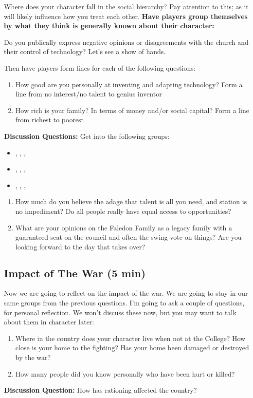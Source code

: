 \documentclass[green]{GL2020}
\begin{document}
Where does your character fall in the social hierarchy? Pay attention to this; as it will likely influence how you treat each other. \textbf{Have players group themselves by what they think is generally known about their character:}

Do you publically express negative opinions or disagreements with the church and their control of technology? Let's see a show of hands. 

Then have players form lines for each of the following questions:
\begin{enumerate}
	\item How good are you personally at inventing and adapting technology? Form a line from no interest/no talent to genius inventor
	\item How rich is your family? In terms of money and/or social capital? Form a line from richest to poorest
\end{enumerate}

\textbf{Discussion Questions:}
Get into the following groups:
\begin{itemize}
	\item \cHeir{}, \cAmbition{}, \cLibrarian{},  \cAssistantScientist{}
	\item \cChupInventor{}, \cHeadScientist{}, \cTechStar{}, \cEthics{}
	\item \cBeetle{}, \cAntiChup{}, \cScholarship{}, \cDiplomat{}
\end{itemize}

\begin{enumerate}
	\item How much do you believe the adage that talent is all you need, and station is no impediment? Do all people really have equal access to opportunities?
	\item What are your opinions on the Faledon Family as a legacy family with a guaranteed seat on the council and often the swing vote on things? Are you looking forward to the day that \cHeir{} takes over?
\end{enumerate}


\subsection*{Impact of The War (5 min)}
Now we are going to reflect on the impact of the war. We are going to stay in our same groups from the previous questions. I’m going to ask a couple of questions, for personal reflection. We won't discuss these now, but you may want to talk about them in character later:
\begin{enumerate}
	\item Where in the country does your character live when not at the College? How close is your home to the fighting? Has your home been damaged or destroyed by the war?
	\item How many people did you know personally who have been hurt or killed?
\end{enumerate}
\textbf{Discussion Question:} How has rationing affected the country?
\end{document}

